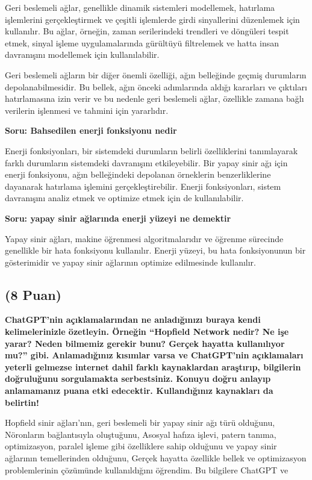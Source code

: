 \documentclass[11pt]{article}
\begin{document}
Geri beslemeli ağlar, genellikle dinamik sistemleri modellemek, hatırlama işlemlerini gerçekleştirmek ve çeşitli işlemlerde girdi sinyallerini düzenlemek için kullanılır. Bu ağlar, örneğin, zaman serilerindeki trendleri ve döngüleri tespit etmek, sinyal işleme uygulamalarında gürültüyü filtrelemek ve hatta insan davranışını modellemek için kullanılabilir.

Geri beslemeli ağların bir diğer önemli özelliği, ağın belleğinde geçmiş durumların depolanabilmesidir. Bu bellek, ağın önceki adımlarında aldığı kararları ve çıktıları hatırlamasına izin verir ve bu nedenle geri beslemeli ağlar, özellikle zamana bağlı verilerin işlenmesi ve tahmini için yararlıdır.

\textbf{Soru: Bahsedilen enerji fonksiyonu nedir}

Enerji fonksiyonları, bir sistemdeki durumların belirli özelliklerini tanımlayarak farklı durumların sistemdeki davranışını etkileyebilir.
Bir yapay sinir ağı için enerji fonksiyonu, ağın belleğindeki depolanan örneklerin benzerliklerine dayanarak hatırlama işlemini gerçekleştirebilir. Enerji fonksiyonları, sistem davranışını analiz etmek ve optimize etmek için de kullanılabilir.

\textbf{Soru: yapay sinir ağlarında enerji yüzeyi ne demektir}

Yapay sinir ağları, makine öğrenmesi algoritmalarıdır ve öğrenme sürecinde genellikle bir hata fonksiyonu kullanılır. Enerji yüzeyi, bu hata fonksiyonunun bir gösterimidir ve yapay sinir ağlarının optimize edilmesinde kullanılır.

\subsection{(8 Puan)} \textbf{ChatGPT’nin açıklamalarından ne anladığınızı buraya kendi kelimelerinizle özetleyin. Örneğin ``Hopfield Network nedir? Ne işe yarar? Neden bilmemiz gerekir bunu? Gerçek hayatta kullanılıyor mu?'' gibi. Anlamadığınız kısımlar varsa ve ChatGPT’nin açıklamaları yeterli gelmezse internet dahil farklı kaynaklardan araştırıp, bilgilerin doğruluğunu sorgulamakta serbestsiniz. Konuyu doğru anlayıp anlamamanız puana etki edecektir. Kullandığınız kaynakları da belirtin!}

Hopfield sinir ağları'nın, geri beslemeli bir yapay sinir ağı türü olduğunu,
Nöronların bağlantısıyla oluştuğunu,
Asosyal hafıza işlevi, patern tanıma, optimizasyon, paralel işleme gibi özelliklere sahip olduğunu ve yapay sinir ağlarının temellerinden olduğunu, Gerçek hayatta özellikle bellek ve optimizasyon problemlerinin çözümünde kullanıldığını öğrendim. Bu bilgilere ChatGPT ve
\end{document}
